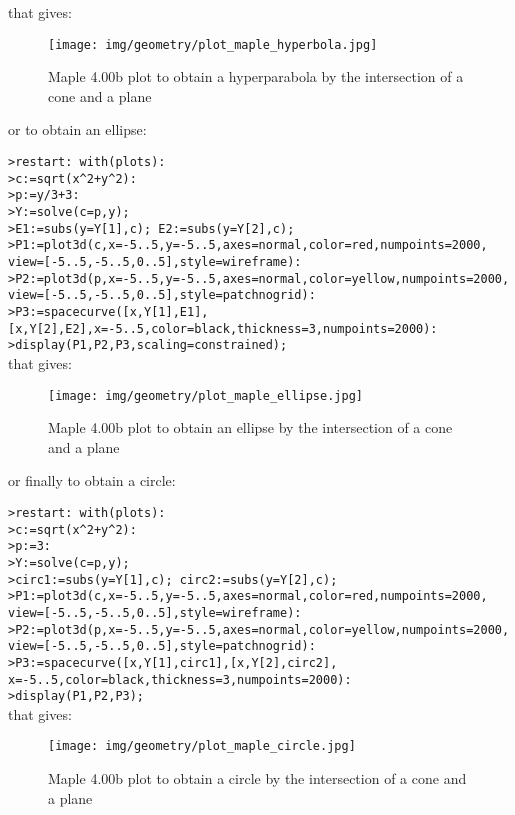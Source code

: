 \begin{enumerate}
		that gives:
		\begin{figure}[H]
			\centering
			\texttt{[image: img/geometry/plot\_maple\_hyperbola.jpg]}
			\caption{Maple 4.00b plot to obtain a hyperparabola by the intersection of a cone and a plane}
		\end{figure}
		or to obtain an ellipse:
		
		\texttt{>restart: with(plots):}\\
		\texttt{>c:=sqrt(x\string^2+y\string^2):}\\
		\texttt{>p:=y/3+3:}\\
		\texttt{>Y:=solve(c=p,y); }\\
		\texttt{>E1:=subs(y=Y[1],c); E2:=subs(y=Y[2],c);}\\
		\texttt{>P1:=plot3d(c,x=-5..5,y=-5..5,axes=normal,color=red,numpoints=2000,}\\
		\texttt{view=[-5..5,-5..5,0..5],style=wireframe):}\\
		\texttt{>P2:=plot3d(p,x=-5..5,y=-5..5,axes=normal,color=yellow,numpoints=2000,}\\
		\texttt{view=[-5..5,-5..5,0..5],style=patchnogrid):}\\
		\texttt{>P3:=spacecurve({[x,Y[1],E1],[x,Y[2],E2]},x=-5..5,color=black,thickness=3,numpoints=2000):}\\
		\texttt{>display(P1,P2,P3,scaling=constrained);}\\
		
		that gives:
		\begin{figure}[H]
			\centering
			\texttt{[image: img/geometry/plot\_maple\_ellipse.jpg]}
			\caption{Maple 4.00b plot to obtain an ellipse by the intersection of a cone and a plane}
		\end{figure}
		or finally to obtain a circle:
		
		\texttt{>restart: with(plots):}\\
		\texttt{>c:=sqrt(x\string^2+y\string^2):}\\
		\texttt{>p:=3:}\\
		\texttt{>Y:=solve(c=p,y);}\\
		\texttt{>circ1:=subs(y=Y[1],c); circ2:=subs(y=Y[2],c);}\\
		\texttt{>P1:=plot3d(c,x=-5..5,y=-5..5,axes=normal,color=red,numpoints=2000,}\\
		\texttt{view=[-5..5,-5..5,0..5],style=wireframe):}\\
		\texttt{>P2:=plot3d(p,x=-5..5,y=-5..5,axes=normal,color=yellow,numpoints=2000,}\\
		\texttt{view=[-5..5,-5..5,0..5],style=patchnogrid):}\\
		\texttt{>P3:=spacecurve({[x,Y[1],circ1],[x,Y[2],circ2]},
x=-5..5,color=black,thickness=3,numpoints=2000):}\\
		\texttt{>display(P1,P2,P3);}\\

		that gives:
		\begin{figure}[H]
			\centering
			\texttt{[image: img/geometry/plot\_maple\_circle.jpg]}
			\caption{Maple 4.00b plot to obtain a circle by the intersection of a cone and a plane}
		\end{figure}		
	\end{enumerate}
